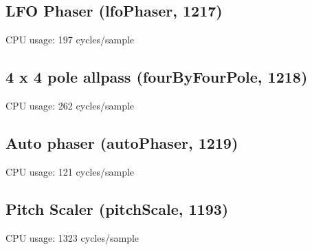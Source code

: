 \documentclass[11pt]{article}
\begin{document}
                \subsection{LFO Phaser (lfoPhaser, 1217)\label{lfoPhaser}\label{id1217}}
CPU usage: 197 cycles/sample

\subsection{4 x 4 pole allpass (fourByFourPole, 1218)\label{fourByFourPole}\label{id1218}}
CPU usage: 262 cycles/sample

\subsection{Auto phaser (autoPhaser, 1219)\label{autoPhaser}\label{id1219}}
CPU usage: 121 cycles/sample

\subsection{Pitch Scaler (pitchScale, 1193)\label{pitchScale}\label{id1193}}
CPU usage: 1323 cycles/sample
\end{document}
